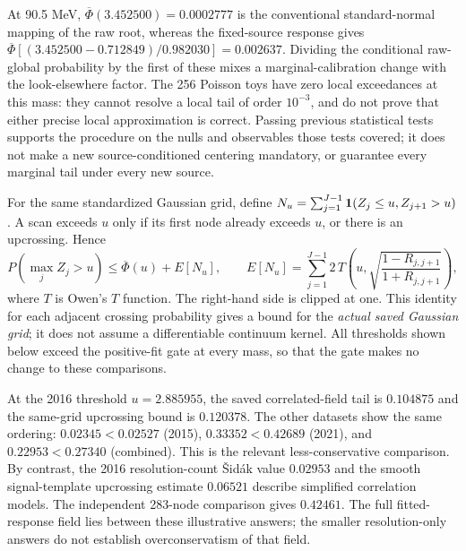 At 90.5 MeV, $\overline\Phi(3.452500)=0.0002777$ is the conventional standard-normal
mapping of the raw root, whereas the fixed-source response gives
$\overline\Phi[(3.452500-0.712849)/0.982030]=0.002637$.
Dividing the conditional raw-global probability by the first of these mixes a
marginal-calibration change with the look-elsewhere factor. The 256 Poisson toys
have zero local exceedances at this mass: they cannot resolve a local tail of
order $10^{-3}$, and do not prove that either precise local approximation is
correct. Passing previous statistical tests supports the procedure on the nulls
and observables those tests covered; it does not make a new source-conditioned
centering mandatory, or guarantee every marginal tail under every new source.

For the same standardized Gaussian grid, define
$N_u=\sum_{j=1}^{J-1}{\bf1}(Z_j\le u,Z_{j+1}>u)$. A scan exceeds $u$ only if its
first node already exceeds $u$, or there is an upcrossing. Hence
\begin{equation}
 P(\max_j Z_j>u)\le
 \overline\Phi(u)+E[N_u],\qquad
 E[N_u]=\sum_{j=1}^{J-1}
 2\,T\!\left(u,\sqrt{\frac{1-R_{j,j+1}}{1+R_{j,j+1}}}\right),
 \label{eq:finite-grid-upcrossing}
\end{equation}
where $T$ is Owen's $T$ function. The right-hand side is clipped at one. This
identity for each adjacent crossing probability gives a bound for the
\emph{actual saved Gaussian grid}; it does not assume a differentiable continuum
kernel. All thresholds shown below exceed the positive-fit gate at every mass,
so that the gate makes no change to these comparisons.

At the 2016 threshold $u=2.885955$, the saved correlated-field tail is
$0.104875$ and the same-grid upcrossing bound is $0.120378$.
The other datasets show the same ordering: $0.02345<0.02527$ (2015),
$0.33352<0.42689$ (2021), and $0.22953<0.27340$ (combined).
This is the relevant less-conservative comparison.
By contrast, the 2016 resolution-count \v{S}id\'ak value $0.02953$ and the smooth
signal-template upcrossing estimate $0.06521$ describe simplified correlation
models. The independent 283-node comparison gives $0.42461$.
The full fitted-response field lies between these illustrative answers; the
smaller resolution-only answers do not establish overconservatism of that field.


